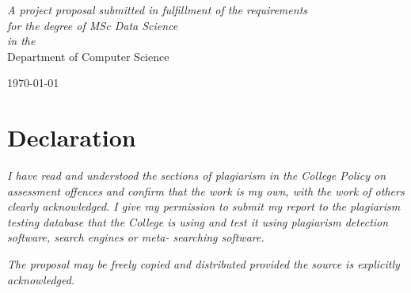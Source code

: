 \documentclass[12pt, twoside, a4paper]{article}
\begin{document}
\begin{titlepage}
\begin{center}
            \large \textit{A project proposal submitted in fulfillment of the requirements\\ for the degree of MSc Data Science}\\[0.3cm] %
            \textit{in the}\\[0.4cm]
            Department of Computer Science\\[2cm] %
 
            \vfill

            {\large \today}\\[4cm] 
 
            \vfill
    \end{center}
\end{titlepage}    
\thispagestyle{empty}
\cleardoublepage


\section*{Declaration}

\vfill
\textit{I have read and understood the sections of plagiarism in the College Policy on assessment offences and confirm that the work is my own, with the work of others clearly acknowledged. I give my permission to submit my report to the plagiarism testing database that the College is using and test it using plagiarism detection software, search engines or meta- searching software.}

\textit{The proposal may be freely copied and distributed provided the source is explicitly acknowledged.}
\vfill

\clearpage
\end{document}

